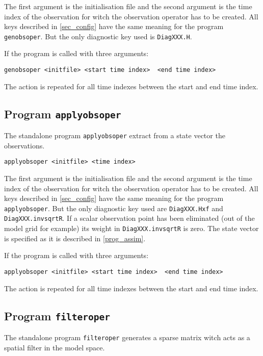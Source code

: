 \documentclass[a4paper,12pt]{article}
\newcommand{\code}{\texttt}
\begin{document}
The first argument is the initialisation file and the second argument is the time index of the observation for witch the observation operator has to be created. All keys described in \ref{sec_config} have the same meaning for the program \code{genobsoper}. But the only diagnostic key used is \code{DiagXXX.H}.

If the program is called with three arguments:

\begin{verbatim}
genobsoper <initfile> <start time index>  <end time index>
\end{verbatim}

The action is repeated for all time indexes between the start and end time index.

\subsection{Program \code{applyobsoper}}

The standalone program \code{applyobsoper} extract from a state vector the observations.

\begin{verbatim}
applyobsoper <initfile> <time index>
\end{verbatim}

The first argument is the initialisation file and the second argument is the time index of the observation for witch the observation operator has to be created. All keys described in \ref{sec_config} have the same meaning for the program \code{applyobsoper}. But the only diagnostic key used are \code{DiagXXX.Hxf} and \code{DiagXXX.invsqrtR}. If a scalar observation point has
been eliminated (out of the model grid for example) its weight in \code{DiagXXX.invsqrtR} is zero. The state vector is specified as it is described in \ref{prog_assim}.

If the program is called with three arguments:

\begin{verbatim}
applyobsoper <initfile> <start time index>  <end time index>
\end{verbatim}

The action is repeated for all time indexes between the start and end time index.

\subsection{Program \code{filteroper}}

The standalone program \code{filteroper} generates a sparse matrix witch acts as a spatial filter in the model space. 
\end{document}
